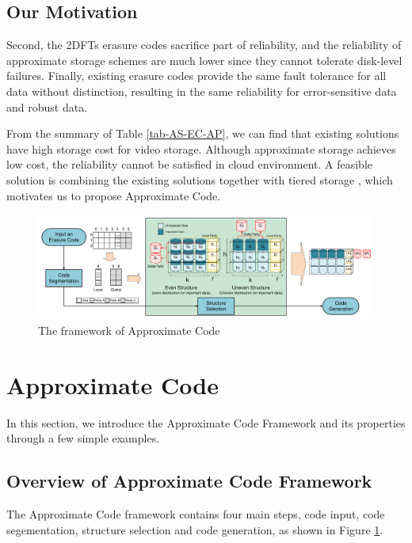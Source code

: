 \documentclass[sigconf]{acmart}
\begin{document}
\subsection{Our Motivation}

Second, the 2DFTs erasure codes sacrifice part of reliability, and the reliability of approximate storage schemes are much lower since they cannot tolerate disk-level failures.
Finally, existing erasure codes provide the same fault tolerance for all data without distinction, resulting in the same reliability for error-sensitive data and robust data.

From the summary of Table \ref{tab-AS-EC-AP}, we can find that existing solutions have high storage cost for video storage. Although approximate storage achieves low cost, the reliability cannot be satisfied in cloud environment. A feasible solution is combining the existing solutions together with tiered storage \cite{krish2014hats} \cite{wang2014balancing} \cite{zhang2010automated} \cite{udipi2012lot}, which motivates us to propose Approximate Code.

\begin{figure}[ht!]
\centering
\includegraphics[width=\linewidth]{photo/Framework-v2.pdf}
\caption{The framework of Approximate Code}
\label{fig-framework}
\end{figure}

\section{Approximate Code}\label{ApCode}
In this section, we introduce the Approximate Code Framework and its properties through a few simple examples.

\subsection{Overview of Approximate Code Framework}
The Approximate Code framework contains four main steps, code input, code segementation, structure selection and code generation, as shown in Figure \ref{fig-framework}.
\end{document}

